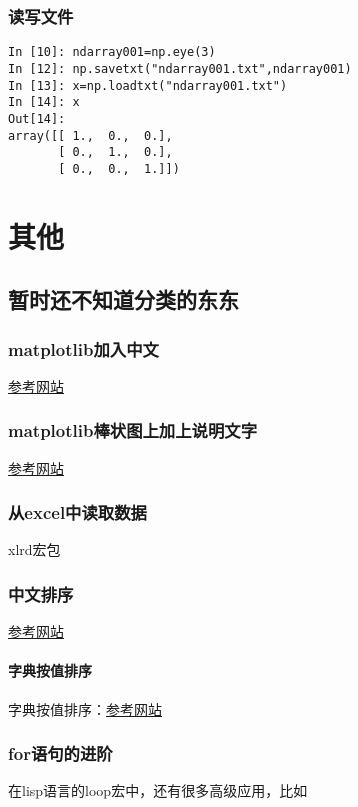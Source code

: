 \documentclass[12pt,oneside]{book}
\begin{document}
\begin{common-format}
\begin{Verbatim}
\end{Verbatim}


\section{读写文件}
\begin{Verbatim}
In [10]: ndarray001=np.eye(3)
In [12]: np.savetxt("ndarray001.txt",ndarray001)
In [13]: x=np.loadtxt("ndarray001.txt")
In [14]: x
Out[14]: 
array([[ 1.,  0.,  0.],
       [ 0.,  1.,  0.],
       [ 0.,  0.,  1.]])
\end{Verbatim}




\part{其他}
\chapter{暂时还不知道分类的东东}

\section{matplotlib加入中文}
\href{http://blog.sciencenet.cn/blog-43412-343002.html }{参考网站}

\section{matplotlib棒状图上加上说明文字}
\href{http://stackoverflow.com/questions/7423445/how-can-i-display-text-over-columns-in-a-bar-chart-in-matplotlib}{参考网站}


\section{从excel中读取数据}
xlrd宏包

\section{中文排序}
\href{https://github.com/mozillazg/python-pinyin}{参考网站}

\subsection{字典按值排序}
字典按值排序：\href{http://www.cnpythoner.com/post/266.html}{参考网站}

\section{for语句的进阶}
在lisp语言的loop宏中，还有很多高级应用，比如


\end{common-format}
\end{document}
